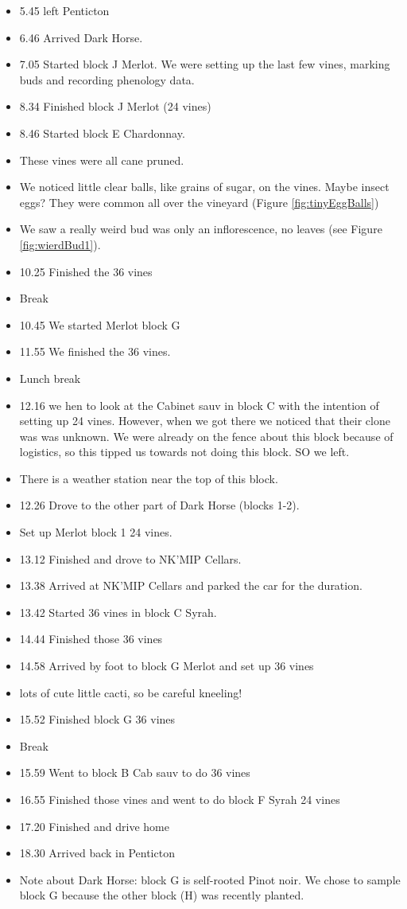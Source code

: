 \documentclass[11pt,letter]{article}
\newenvironment{smitemize}{
\begin{itemize}
  \setlength{\itemsep}{0pt}
  \setlength{\parskip}{0.8pt}
  \setlength{\parsep}{0pt}}
{\end{itemize}
}
\begin{document}
\begin{smitemize}
\item 5.45 left Penticton 
\item 6.46 Arrived Dark Horse.
\item 7.05 Started block J Merlot.  We were setting up the last few vines, marking buds and recording phenology data.
\item 8.34 Finished block J Merlot (24 vines)
\item 8.46 Started block E Chardonnay.
\item These vines were all cane pruned.
\item We noticed little clear balls, like grains of sugar, on the vines. Maybe insect eggs? They were common all over the vineyard (Figure \ref{fig:tinyEggBalls})
\item We saw a really weird bud was only an inflorescence, no leaves (see Figure \ref{fig:wierdBud1}).
\item 10.25 Finished the 36 vines
\item Break
\item 10.45 We started Merlot block G
\item 11.55 We finished the 36 vines.
\item Lunch break
\item 12.16 we hen to look at the Cabinet sauv in block C with the intention of setting up 24 vines. However, when we got there we noticed that their clone was was unknown. We were already on the fence about this block because of logistics, so this tipped us towards not doing this block. SO we left. 
\item There is a weather station near the top of this block.
\item 12.26 Drove to the other part of Dark Horse (blocks 1-2).
\item Set up Merlot block 1 24 vines. 
\item 13.12 Finished and drove to NK'MIP Cellars.
\item 13.38 Arrived at NK'MIP Cellars and parked the car for the duration.
\item 13.42 Started 36 vines in block C Syrah.
\item 14.44 Finished those 36 vines
\item 14.58 Arrived by foot to block G Merlot and set up 36 vines 
\item lots of cute little cacti, so be careful kneeling!
\item 15.52 Finished block G 36 vines
\item Break
\item 15.59 Went to block B Cab sauv to do 36 vines
\item 16.55 Finished those vines and went to do block F Syrah 24 vines
\item 17.20 Finished and drive home
\item 18.30 Arrived back in Penticton  \\

\item Note about Dark Horse: block G is self-rooted Pinot noir. We chose to sample block G because the other block (H) was recently planted.

\end{smitemize}
\end{document}
